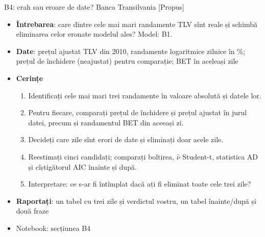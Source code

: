\begin{frame}{B4: crah sau eroare de date? Banca Transilvania [Propus]}
\itemsize{\scriptsize}
\begin{itemize}
\item \textbf{Întrebarea}: care dintre cele mai mari randamente TLV sînt reale și schimbă eliminarea celor eronate modelul ales? Model: B1.
\item \textbf{Date}: prețul ajustat TLV din 2010, randamente logaritmice zilnice în \%; prețul de închidere (neajustat) pentru comparație; BET în aceleași zile
\item \textbf{Cerințe}
\begin{enumerate}
    \item Identificați cele mai mari trei randamente în valoare absolută și datele lor.
    \item Pentru fiecare, comparați prețul de închidere și prețul ajustat în jurul datei, precum și randamentul BET din aceeași zi.
    \item Decideți care zile sînt erori de date și eliminați doar acele zile.
    \item Reestimați cinci candidați; comparați boltirea, $\hat\nu$ Student-t, statistica AD și cîștigătorul AIC înainte și după.
    \item Interpretare: ce s-ar fi întîmplat dacă ați fi eliminat toate cele trei zile?
\end{enumerate}
\item \textbf{Raportați}: un tabel cu trei zile și verdictul vostru, un tabel înainte/după și două fraze
\item Notebook: secțiunea B4
\end{itemize}
\end{frame}


